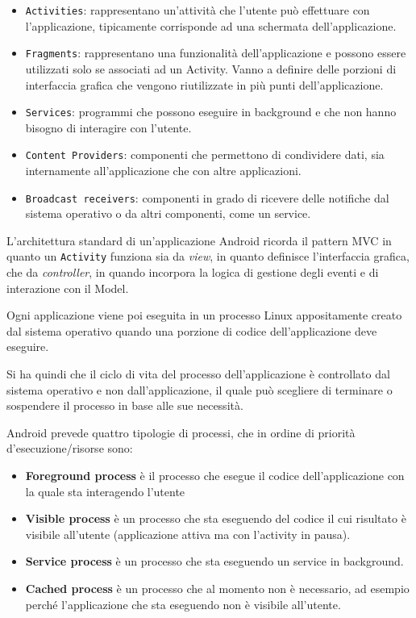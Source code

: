 \begin{itemize}
	\item \texttt{Activities}: rappresentano un'attività che l'utente può
		effettuare con l'applicazione, tipicamente corrisponde ad una
		schermata dell'applicazione.
	\item \texttt{Fragments}: rappresentano una funzionalità dell'applicazione e
		possono essere utilizzati solo se associati ad un Activity. Vanno a
		definire delle porzioni di interfaccia grafica che vengono
		riutilizzate in più punti dell'applicazione.
	\item \texttt{Services}: programmi che possono eseguire in background e che
		non hanno bisogno di interagire con l'utente.
	\item \texttt{Content Providers}: componenti che permettono di condividere
		dati, sia internamente all'applicazione che con altre applicazioni.
	\item \texttt{Broadcast receivers}: componenti in grado di ricevere delle
		notifiche dal sistema operativo o da altri componenti, come un
		service.
\end{itemize}

L'architettura standard di un'applicazione Android ricorda il pattern
MVC in quanto un \texttt{Activity} funziona sia da \textit{view}, in quanto definisce
l'interfaccia grafica, che da \textit{controller}, in quando incorpora la logica
di gestione degli eventi e di interazione con il Model.

Ogni applicazione viene poi eseguita in un processo Linux appositamente
creato dal sistema operativo quando una porzione di codice
dell'applicazione deve eseguire.

Si ha quindi che il ciclo di vita del processo dell'applicazione è
controllato dal sistema operativo e non dall'applicazione, il quale può
scegliere di terminare o sospendere il processo in base alle sue
necessità.

Android prevede quattro tipologie di processi, che in ordine di priorità
d'esecuzione/risorse sono:

\begin{itemize}
	\item \textbf{Foreground process} è il processo che esegue il codice
		dell'applicazione con la quale sta interagendo l'utente
	\item \textbf{Visible process} è un processo che sta eseguendo del codice il
		cui risultato è visibile all'utente (applicazione attiva ma con
		l'activity in pausa).
	\item \textbf{Service process} è un processo che sta eseguendo un service in
		background.
	\item \textbf{Cached process} è un processo che al momento non è necessario,
		ad esempio perché l'applicazione che sta eseguendo non è visibile
		all'utente.
\end{itemize}

